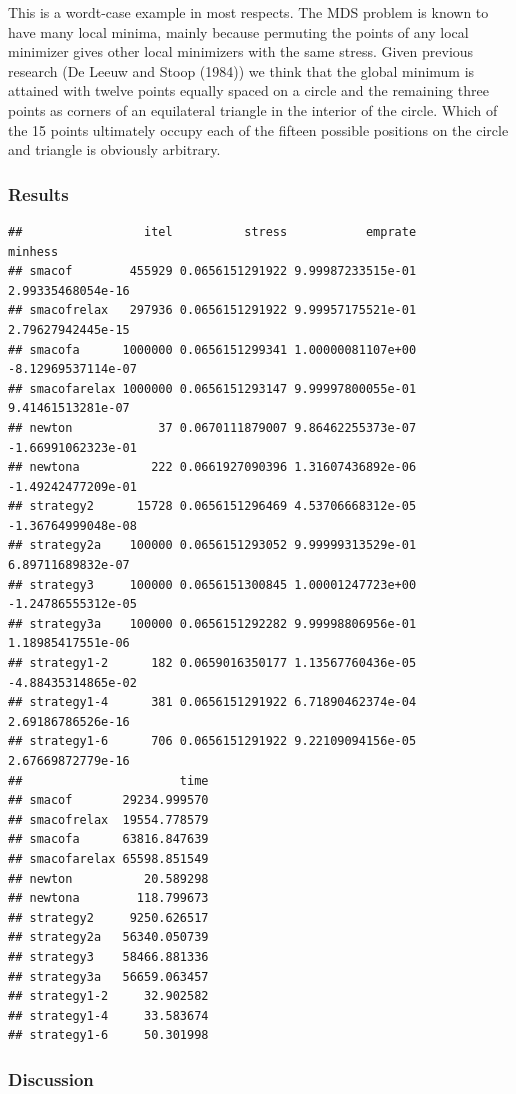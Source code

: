 \documentclass[
  12pt,
]{article}
\begin{document}
This is a wordt-case example in most respects. The MDS problem is known to have many local minima, mainly because permuting the points of any local minimizer gives other local minimizers with the same stress. Given previous research
(De Leeuw and Stoop (1984)) we think that the global minimum is attained with twelve points
equally spaced on a circle and the remaining three points as corners of an equilateral triangle in the interior of the circle. Which of the 15 points ultimately occupy each of the fifteen possible positions on the circle and triangle is obviously arbitrary.

\subsubsection{Results}\label{results-2}

\begin{verbatim}
##                 itel          stress           emprate            minhess
## smacof        455929 0.0656151291922 9.99987233515e-01  2.99335468054e-16
## smacofrelax   297936 0.0656151291922 9.99957175521e-01  2.79627942445e-15
## smacofa      1000000 0.0656151299341 1.00000081107e+00 -8.12969537114e-07
## smacofarelax 1000000 0.0656151293147 9.99997800055e-01  9.41461513281e-07
## newton            37 0.0670111879007 9.86462255373e-07 -1.66991062323e-01
## newtona          222 0.0661927090396 1.31607436892e-06 -1.49242477209e-01
## strategy2      15728 0.0656151296469 4.53706668312e-05 -1.36764999048e-08
## strategy2a    100000 0.0656151293052 9.99999313529e-01  6.89711689832e-07
## strategy3     100000 0.0656151300845 1.00001247723e+00 -1.24786555312e-05
## strategy3a    100000 0.0656151292282 9.99998806956e-01  1.18985417551e-06
## strategy1-2      182 0.0659016350177 1.13567760436e-05 -4.88435314865e-02
## strategy1-4      381 0.0656151291922 6.71890462374e-04  2.69186786526e-16
## strategy1-6      706 0.0656151291922 9.22109094156e-05  2.67669872779e-16
##                      time
## smacof       29234.999570
## smacofrelax  19554.778579
## smacofa      63816.847639
## smacofarelax 65598.851549
## newton          20.589298
## newtona        118.799673
## strategy2     9250.626517
## strategy2a   56340.050739
## strategy3    58466.881336
## strategy3a   56659.063457
## strategy1-2     32.902582
## strategy1-4     33.583674
## strategy1-6     50.301998
\end{verbatim}

\subsubsection{Discussion}\label{discussion-2}
\end{document}
